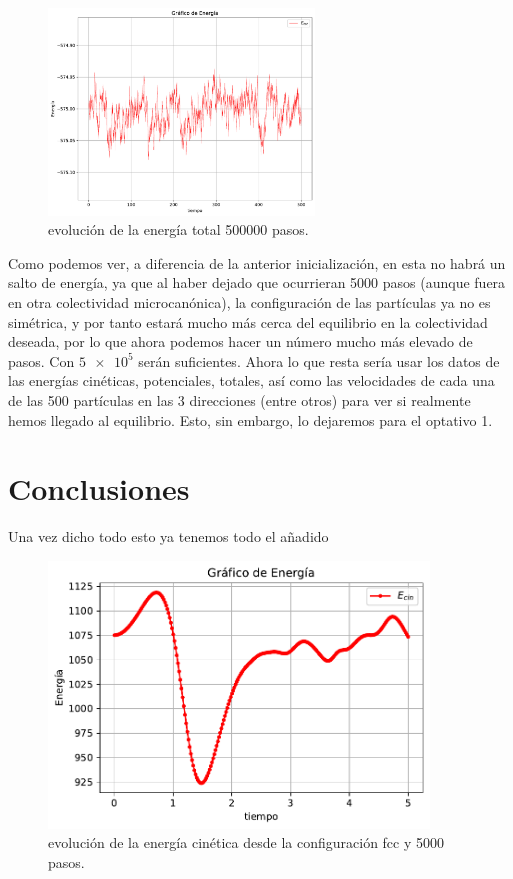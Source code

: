 \documentclass[11pt]{article} %
\begin{document}
\begin{figure}[h!] \centering
	\includegraphics[width=0.63\textwidth]{../../Graficas/Et-equilibra-500K.pdf}
	\caption{evolución de la energía total 500000 pasos.}
	\label{Fig:04}
\end{figure}	

Como podemos ver, a diferencia de la anterior inicialización, en esta no habrá un salto de energía, ya que al haber dejado que ocurrieran 5000 pasos (aunque fuera en otra colectividad microcanónica), la configuración de las partículas ya no es simétrica, y por tanto estará mucho más cerca del equilibrio en la colectividad deseada, por lo que ahora podemos hacer un número mucho más elevado de pasos. Con $\num{5e5}$ serán suficientes. Ahora lo que resta sería usar los datos de las energías cinéticas, potenciales, totales, así como las velocidades de cada una de las 500 partículas en las 3 direcciones (entre otros) para ver si realmente hemos llegado al equilibrio. Esto, sin embargo, lo dejaremos para el optativo 1.

\section{Conclusiones}

Una vez dicho todo esto ya tenemos todo el añadido

\begin{figure}[h!] \centering
	\includegraphics[width=0.9\textwidth]{../../Graficas/Ecin-equilibra.pdf}
	\caption{evolución de la energía cinética desde la configuración fcc y 5000 pasos.}
	\label{Fig:02}
\end{figure}	
\end{document}
